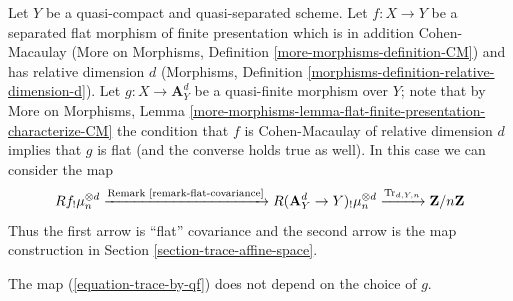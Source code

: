 \noindent
Let $Y$ be a quasi-compact and quasi-separated scheme.
Let $f : X \to Y$ be a separated flat morphism of finite presentation
which is in addition Cohen-Macaulay (More on Morphisms, Definition
\ref{more-morphisms-definition-CM}) and has relative dimension $d$
(Morphisms, Definition \ref{morphisms-definition-relative-dimension-d}).
Let $g : X \to \mathbf{A}^d_Y$ be a quasi-finite morphism over $Y$;
note that by More on Morphisms, Lemma
\ref{more-morphisms-lemma-flat-finite-presentation-characterize-CM}
the condition that $f$ is Cohen-Macaulay of relative dimension $d$
implies that $g$ is flat (and the converse holds true as well).
In this case we can consider the map
\begin{equation}
\label{equation-trace-by-qf}
Rf_!\mu_n^{\otimes d} \xrightarrow{\text{Remark \ref{remark-flat-covariance}}}
R(\mathbf{A}^d_Y \to Y)_!\mu_n^{\otimes d}
\xrightarrow{\text{Tr}_{d, Y, n}}
\mathbf{Z}/n\mathbf{Z}
\end{equation}
Thus the first arrow is ``flat'' covariance and the second arrow is
the map construction in Section \ref{section-trace-affine-space}.

\begin{lemma}
\label{lemma-trace-by-qf}
The map (\ref{equation-trace-by-qf}) does not depend on the choice of $g$.
\end{lemma}


